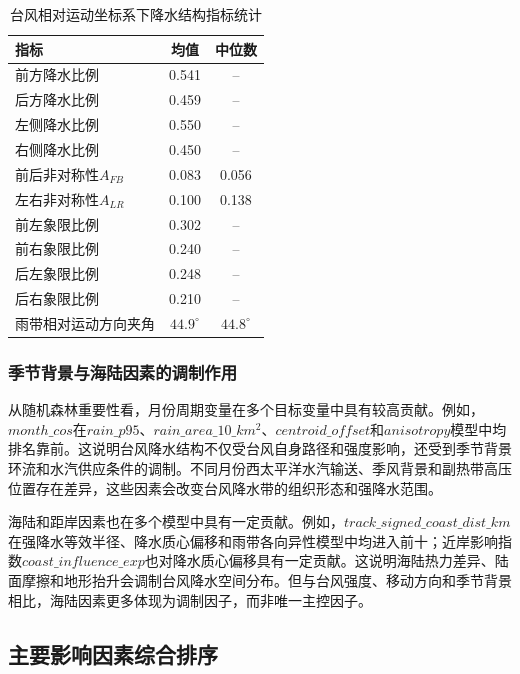 \documentclass[UTF8,a4paper,zihao=5]{ctexart}
\numberwithin{equation}{section}
\numberwithin{figure}{section}
\numberwithin{table}{section}
\begin{document}
\begin{table}[htbp]
    \centering
    \caption{台风相对运动坐标系下降水结构指标统计}
    \label{tab:motion_relative_stats_problem1}
    \begin{tabular}{lcc}
        \hline
        指标 & 均值 & 中位数 \\
        \hline
        前方降水比例 & 0.541 & -- \\
        后方降水比例 & 0.459 & -- \\
        左侧降水比例 & 0.550 & -- \\
        右侧降水比例 & 0.450 & -- \\
        前后非对称性$A_{FB}$ & 0.083 & 0.056 \\
        左右非对称性$A_{LR}$ & 0.100 & 0.138 \\
        前左象限比例 & 0.302 & -- \\
        前右象限比例 & 0.240 & -- \\
        后左象限比例 & 0.248 & -- \\
        后右象限比例 & 0.210 & -- \\
        雨带相对运动方向夹角 & $44.9^\circ$ & $44.8^\circ$ \\
        \hline
    \end{tabular}
\end{table}

\subsubsection{季节背景与海陆因素的调制作用}

从随机森林重要性看，月份周期变量在多个目标变量中具有较高贡献。例如，$month\_cos$在$rain\_p95$、$rain\_area\_10\_km^2$、$centroid\_offset$和$anisotropy$模型中均排名靠前。这说明台风降水结构不仅受台风自身路径和强度影响，还受到季节背景环流和水汽供应条件的调制。不同月份西太平洋水汽输送、季风背景和副热带高压位置存在差异，这些因素会改变台风降水带的组织形态和强降水范围。

海陆和距岸因素也在多个模型中具有一定贡献。例如，$track\_signed\_coast\_dist\_km$在强降水等效半径、降水质心偏移和雨带各向异性模型中均进入前十；近岸影响指数$coast\_influence\_exp$也对降水质心偏移具有一定贡献。这说明海陆热力差异、陆面摩擦和地形抬升会调制台风降水空间分布。但与台风强度、移动方向和季节背景相比，海陆因素更多体现为调制因子，而非唯一主控因子。

\subsection{主要影响因素综合排序}
\end{document}
